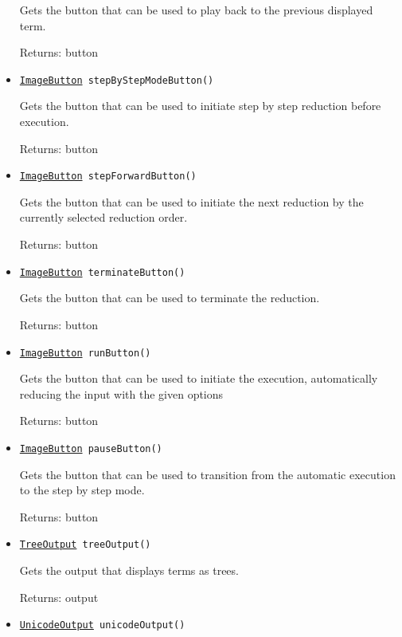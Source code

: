 \begin{itemize}
Gets the button that can be used to play back to the previous displayed term.

Returns: button

\item \texttt{\hyperref[type:edu.kit.wavelength.client.view.webui.component.ImageButton]{ImageButton} stepByStepModeButton()}

Gets the button that can be used to initiate step by step reduction before execution.

Returns: button

\item \texttt{\hyperref[type:edu.kit.wavelength.client.view.webui.component.ImageButton]{ImageButton} stepForwardButton()}

Gets the button that can be used to initiate the next reduction by the currently selected reduction order.

Returns: button

\item \texttt{\hyperref[type:edu.kit.wavelength.client.view.webui.component.ImageButton]{ImageButton} terminateButton()}

Gets the button that can be used to terminate the reduction.

Returns: button

\item \texttt{\hyperref[type:edu.kit.wavelength.client.view.webui.component.ImageButton]{ImageButton} runButton()}

Gets the button that can be used to initiate the execution, automatically reducing the input with the given options

Returns: button

\item \texttt{\hyperref[type:edu.kit.wavelength.client.view.webui.component.ImageButton]{ImageButton} pauseButton()}

Gets the button that can be used to transition from the automatic execution to the step by step mode.

Returns: button

\item \texttt{\hyperref[type:edu.kit.wavelength.client.view.webui.component.TreeOutput]{TreeOutput} treeOutput()}

Gets the output that displays terms as trees.

Returns: output

\item \texttt{\hyperref[type:edu.kit.wavelength.client.view.webui.component.UnicodeOutput]{UnicodeOutput} unicodeOutput()}


\end{itemize}
